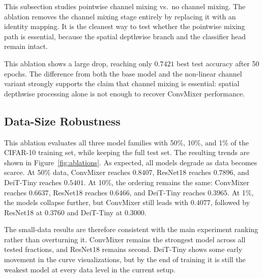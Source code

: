 This subsection studies pointwise channel mixing vs.\ no channel mixing. The ablation removes the channel mixing stage entirely by replacing it with an identity mapping. It is the cleanest way to test whether the pointwise mixing path is essential, because the spatial depthwise branch and the classifier head remain intact.

This ablation shows a large drop, reaching only $0.7421$ best test accuracy after 50 epochs. The difference from both the base model and the non-linear channel variant strongly supports the claim that channel mixing is essential: spatial depthwise processing alone is not enough to recover ConvMixer performance.

\subsection{Data-Size Robustness}

This ablation evaluates all three model families with 50\%, 10\%, and 1\% of the CIFAR-10 training set, while keeping the full test set. The resulting trends are shown in Figure~\ref{fig:ablations}. As expected, all models degrade as data becomes scarce. At 50\% data, ConvMixer reaches $0.8407$, ResNet18 reaches $0.7896$, and DeiT-Tiny reaches $0.5401$. At 10\%, the ordering remains the same: ConvMixer reaches $0.6637$, ResNet18 reaches $0.6466$, and DeiT-Tiny reaches $0.3965$. At 1\%, the models collapse further, but ConvMixer still leads with $0.4077$, followed by ResNet18 at $0.3760$ and DeiT-Tiny at $0.3000$.

The small-data results are therefore consistent with the main experiment ranking rather than overturning it. ConvMixer remains the strongest model across all tested fractions, and ResNet18 remains second. DeiT-Tiny shows some early movement in the curve visualizations, but by the end of training it is still the weakest model at every data level in the current setup.
